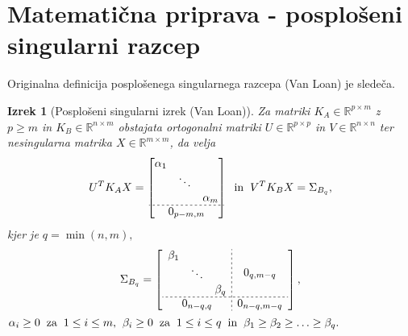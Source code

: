 \documentclass[mat1]{article}
\newtheorem{izrek}{Izrek}
\theoremstyle{definition}
\begin{document}
\section{Matematična priprava - posplošeni singularni razcep}
Originalna definicija posplošenega singularnega razcepa (Van Loan) \cite{GSVD-1} je sledeča.

\begin{izrek}[Posplošeni singularni izrek (Van Loan)]
\label{izrek:SVD} Za matriki $K_A \in \mathbb{R}^{p \times m}$ z $p \geq m$ in $K_B \in \mathbb{R}^{n \times m}$ obstajata ortogonalni matriki $U \in \mathbb{R}^{p \times p}$ in $V \in \mathbb{R}^{n \times n}$ ter nesingularna matrika $X \in \mathbb{R}^{m \times m}$, da velja 
$$ U^T K_A X = 
\begin{bmatrix}
\begin{matrix}
\alpha_1 & & \\
 & \ddots & \\
 & & \alpha_m
\end{matrix} \\ \hdashline[2pt/2pt]
0_{p-m, m}
\end{bmatrix} 
\hspace{2mm} \text{in} \hspace{2mm}
 V^T K_B X = 
\Sigma_{B_q} \text{,}
$$ kjer je $q = \min(n,m) \text{,}$
\begin{gather*}
\Sigma_{B_q} = 
\left[
\begin{array}{c;{2pt/2pt}c}
\begin{matrix}
\beta_1 & & \\
 & \ddots & \\
 & & \beta_q
\end{matrix} & 0_{q, m - q}
 \\ \hdashline[2pt/2pt]
0_{n-q, q} & 0_{n-q, m-q}
\end{array} \right] \text{,} 
\end{gather*} %
$
\alpha_i \geq 0 \hspace{2mm} \text{za} \hspace{2mm}
 1 \leq i \leq m \text{,} \hspace{2mm}
  \beta_i \geq 0 \hspace{2mm} \text{za} \hspace{2mm} 1 \leq i \leq q
\hspace{2mm} \text{in} \hspace{2mm} \beta_1 \geq \beta_2 \geq \ldots \geq \beta_q
\text{.}
$
\end{izrek}
\end{document}
